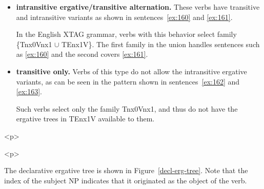 \begin{itemize} 
\item {\bf intransitive ergative/transitive alternation.}  These verbs have 
transitive and intransitive variants as shown in sentences~\ref{ex:160} and 
\ref{ex:161}. 
 
\beginsentences
{}\label{ex:160} 
\label{ex:161} 
\endsentences

 
In the English XTAG grammar, verbs with this behavior select family 
\{Tnx0Vnx1 $\cup$ TEnx1V\}.  The first family in the union handles 
sentences such as \ref{ex:160} and the second covers \ref{ex:161}. 
 
\item {\bf transitive only.}  Verbs of this type do not allow the 
intransitive ergative variants, as can be seen in the pattern shown in 
sentences~\ref{ex:162} and \ref{ex:163}. 
 
\beginsentences
{}\label{ex:162} 
\label{ex:163} 
\endsentences

 
Such verbs select only the family Tnx0Vnx1, and thus do not have the 
ergative trees in TEnx1V available to them. 
 
\end{itemize} 
 
\begin{rawhtml} <p> \end{rawhtml}
\centering 
\mbox{} 
\begin{rawhtml} <dl> <dt>{Ergative Tree: $\alpha$Enx1V <p> </dl> \end{rawhtml}
\label{decl-erg-tree} 
\label{2;14,1} 
\begin{rawhtml} <p> \end{rawhtml}
 
The declarative ergative tree is shown in Figure~\ref{decl-erg-tree}. 
Note that the index of the subject NP indicates that it originated as 
the object of the verb. 
 
 
 
 
 
 
 
 
 
 
 
 
 
 
 
 
 
 
 
 
 
 
 
